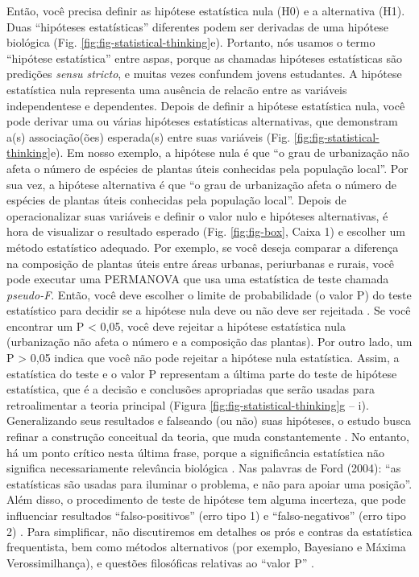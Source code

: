 \documentclass[
]{book}
\begin{document}
Então, você precisa definir as hipótese estatística nula (H0) e a alternativa (H1). Duas ``hipóteses estatísticas'' diferentes podem ser derivadas de uma hipótese biológica (Fig. \ref{fig:fig-statistical-thinking}e). Portanto, nós usamos o termo ``hipótese estatística'' entre aspas, porque as chamadas hipóteses estatísticas são predições \emph{sensu stricto}, e muitas vezes confundem jovens estudantes. A hipótese estatística nula representa uma ausência de relacão entre as variáveis independentese e dependentes. Depois de definir a hipótese estatística nula, você pode derivar uma ou várias hipóteses estatísticas alternativas, que demonstram a(s) associação(ões) esperada(s) entre suas variáveis (Fig. \ref{fig:fig-statistical-thinking}e). Em nosso exemplo, a hipótese nula é que ``o grau de urbanização não afeta o número de espécies de plantas úteis conhecidas pela população local''. Por sua vez, a hipótese alternativa é que ``o grau de urbanização afeta o número de espécies de plantas úteis conhecidas pela população local''. Depois de operacionalizar suas variáveis e definir o valor nulo e hipóteses alternativas, é hora de visualizar o resultado esperado (Fig. \ref{fig:fig-box}, Caixa 1) e escolher um método estatístico adequado. Por exemplo, se você deseja comparar a diferença na composição de plantas úteis entre áreas urbanas, periurbanas e rurais, você pode executar uma PERMANOVA \citep{albuquerque_multidimensional_2019} que usa uma estatística de teste chamada \emph{pseudo-F}. Então, você deve escolher o limite de probabilidade (o valor P) do teste estatístico para decidir se a hipótese nula deve ou não deve ser rejeitada \citep{gotelli_primer_2012}. Se você encontrar um P \textless{} 0,05, você deve rejeitar a hipótese estatística nula (urbanização não afeta o número e a composição das plantas). Por outro lado, um P \textgreater{} 0,05 indica que você não pode rejeitar a hipótese nula estatística. Assim, a estatística do teste e o valor P representam a última parte do teste de hipótese estatística, que é a decisão e conclusões apropriadas que serão usadas para retroalimentar a teoria principal (Figura \ref{fig:fig-statistical-thinking}g -- i). Generalizando seus resultados e falseando (ou não) suas hipóteses, o estudo busca refinar a construção conceitual da teoria, que muda constantemente \citep[Fig. 1i,][]{ford_scientific_2004}. No entanto, há um ponto crítico nesta última frase, porque a significância estatística não significa necessariamente relevância biológica \citep[ver discussão em][ e \citet{martinez-abrain_statistical_2008}]{gotelli_primer_2012}. Nas palavras de Ford (2004): ``as estatísticas são usadas para iluminar o problema, e não para apoiar uma posição''. Além disso, o procedimento de teste de hipótese tem alguma incerteza, que pode influenciar resultados ``falso-positivos'' (erro tipo 1) e ``falso-negativos'' (erro tipo 2) \citep{whitlock_analysis_2015}. Para simplificar, não discutiremos em detalhes os prós e contras da estatística frequentista, bem como métodos alternativos (por exemplo, Bayesiano e Máxima Verossimilhança), e questões filosóficas relativas ao ``valor P'' \citep[para uma discussão sobre esses tópicos, consulte o fórum em][]{ellison_p_2014}.
\end{document}
